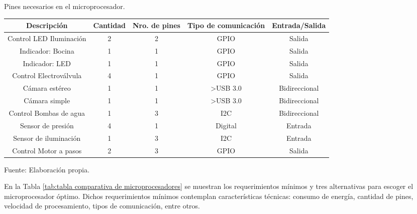 
\begin{mytable}[H]
	\footnotesize\centering
	\caption{Pines necesarios en el microprocesador.}
	\label{tab:pines necesarios en el microprocesador}
	\begin{tabular}{|c|c|c|c|c|}
		\hline
		\textbf{Descripción} & \textbf{Cantidad} & \textbf{Nro. de pines} & \textbf{Tipo de comunicación} & \textbf{Entrada/Salida} \\ \hline
		Control LED Iluminación   & 2 & 2 & GPIO                  & Salida        \\ \hline
		Indicador: Bocina         & 1 & 1 & GPIO                  & Salida        \\ \hline
		Indicador: LED            & 1 & 1 & GPIO                  & Salida        \\ \hline
		Control Electroválvula    & 4 & 1 & GPIO                  & Salida        \\ \hline
		Cámara estéreo            & 1 & 1 & \textgreater{}USB 3.0 & Bidireccional \\ \hline
		Cámara simple             & 1 & 1 & \textgreater{}USB 3.0 & Bidireccional \\ \hline
		Control Bombas de agua    & 1 & 3 & I2C                   & Bidireccional \\ \hline
		Sensor de presión         & 4 & 1 & Digital               & Entrada       \\ \hline
		Sensor de iluminación     & 1 & 3 & I2C                   & Entrada        \\ \hline
		Control Motor a pasos     & 2 & 3 & GPIO                  & Salida        \\ \hline
	\end{tabular}
	\begin{myflushcenteraftertable}	
		Fuente: Elaboración propia.
	\end{myflushcenteraftertable}
\end{mytable}

En la Tabla \ref{tab:tabla comparativa de microprocesadores} se muestran los requerimientos mínimos y tres alternativas para escoger el microprocesador óptimo. Dichos requerimientos mínimos contemplan características técnicas: consumo de energía, cantidad de pines, velocidad de procesamiento, tipos de comunicación, entre otros.

